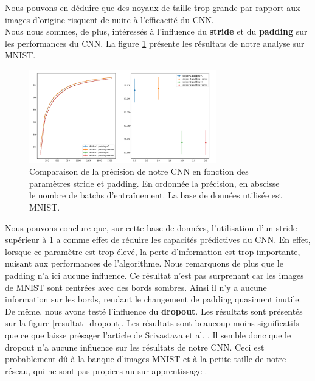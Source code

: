 Nous pouvons en déduire que des noyaux de taille trop grande par rapport aux images d'origine risquent de nuire à l'efficacité du CNN. \\

Nous nous sommes, de plus, intéressés à l'influence du \textbf{stride} et du \textbf{padding} sur les performances du CNN. La figure \ref{resultat_padding_stride} présente les résultats de notre analyse sur MNIST.

\begin{figure}[!h]
\centering
\includegraphics[width=230pt]{images/cnn/CNN_padding_stride.png}
\caption{Comparaison de la précision de notre CNN en fonction des paramètres stride et padding. En ordonnée la précision, en abscisse le nombre de batchs d’entraînement. La base de données utilisée est MNIST.}
\label{resultat_padding_stride}
\end{figure}

Nous pouvons conclure que, sur cette base de données, l'utilisation d'un stride supérieur à 1 a comme effet de réduire les capacités prédictives du CNN. En effet, lorsque ce paramètre est trop élevé, la perte d'information est trop importante, nuisant aux performances de l'algorithme. Nous remarquons de plus que le padding n'a ici aucune influence. Ce résultat n'est pas surprenant car les images de MNIST sont centrées avec des bords sombres. Ainsi il n'y a aucune information sur les bords, rendant le changement de padding quasiment inutile. \\

De même, nous avons testé l'influence du \textbf{dropout}. Les résultats sont présentés sur la figure \ref{resultat_dropout}. Les résultats sont beaucoup moins significatifs que ce que laisse présager l'article de Srivastava et al. \cite{srivastava_dropout_nodate}. Il semble donc que le dropout n'a aucune influence sur les résultats de notre CNN. Ceci est probablement dû à la banque d'images MNIST et à la petite taille de notre réseau, qui ne sont pas propices au sur-apprentissage .
  
